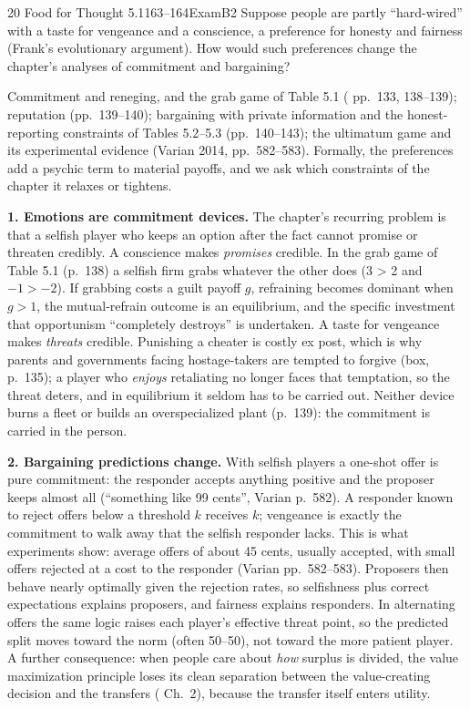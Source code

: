 \begin{exsol}{20}{\MR{} Food for Thought 5.1}{163--164}{Exam}{B2}
\asked Suppose people are partly ``hard-wired'' with a taste for vengeance and a conscience, a
preference for honesty and fairness (Frank's evolutionary argument). How would such preferences
change the chapter's analyses of commitment and bargaining?

\method Commitment and reneging, and the grab game of Table 5.1 (\MR{} pp.~133, 138--139);
reputation (pp.~139--140); bargaining with private information and the honest-reporting
constraints of Tables 5.2--5.3 (pp.~140--143); the ultimatum game and its experimental evidence
(Varian 2014, pp.~582--583). Formally, the preferences add a psychic term to material payoffs,
and we ask which constraints of the chapter it relaxes or tightens.

\solution
\textbf{1. Emotions are commitment devices.} The chapter's recurring problem is that a selfish
player who keeps an option after the fact cannot promise or threaten credibly. A conscience makes
\emph{promises} credible. In the grab game of Table 5.1 (p.~138) a selfish firm grabs whatever
the other does (3 > 2 and $-1 > -2$). If grabbing costs a guilt payoff $g$, refraining becomes
dominant when $g > 1$, the mutual-refrain outcome is an equilibrium, and the specific investment
that opportunism ``completely destroys'' is undertaken. A taste for vengeance makes
\emph{threats} credible. Punishing a cheater is costly ex post, which is why parents and
governments facing hostage-takers are tempted to forgive (box, p.~135); a player who
\emph{enjoys} retaliating no longer faces that temptation, so the threat deters, and in
equilibrium it seldom has to be carried out. Neither device burns a fleet or builds an
overspecialized plant (p.~139): the commitment is carried in the person.

\textbf{2. Bargaining predictions change.} With selfish players a one-shot offer is pure
commitment: the responder accepts anything positive and the proposer keeps almost all (``something
like 99 cents'', Varian p.~582). A responder known to reject offers below a threshold $k$ receives
$k$; vengeance is exactly the commitment to walk away that the selfish responder lacks. This is
what experiments show: average offers of about 45 cents, usually accepted, with small offers
rejected at a cost to the responder (Varian pp.~582--583). Proposers then behave nearly optimally
given the rejection rates, so selfishness plus correct expectations explains proposers, and
fairness explains responders. In alternating offers the same logic raises each player's
effective threat point, so the predicted split moves toward the norm (often 50--50), not toward
the more patient player. A further consequence: when people care about \emph{how} surplus is
divided, the value maximization principle loses its clean separation between the value-creating
decision and the transfers (\MR{} Ch.~2), because the transfer itself enters utility.


\end{exsol}

